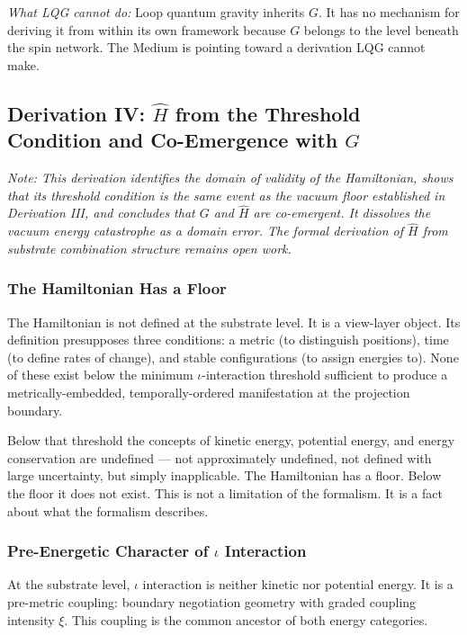 \documentclass[11pt,letterpaper]{article}
\begin{document}
\emph{What LQG cannot do:} Loop quantum gravity inherits \(G\). It has no mechanism for deriving it from within its own framework because \(G\) belongs to the level beneath the spin network. The Medium is pointing toward a derivation LQG cannot make.

\subsection{Derivation IV: \(\hat{H}\) from the Threshold Condition and Co-Emergence with \(G\)}
\label{sec:org7106cd5}

\emph{Note: This derivation identifies the domain of validity of the Hamiltonian, shows that its threshold condition is the same event as the vacuum floor established in Derivation III, and concludes that \(G\) and \(\hat{H}\) are co-emergent. It dissolves the vacuum energy catastrophe as a domain error. The formal derivation of \(\hat{H}\) from substrate combination structure remains open work.}

\subsubsection{The Hamiltonian Has a Floor}
\label{sec:orga63faad}

The Hamiltonian is not defined at the substrate level. It is a view-layer object. Its definition presupposes three conditions: a metric (to distinguish positions), time (to define rates of change), and stable configurations (to assign energies to). None of these exist below the minimum \(\iota\)-interaction threshold sufficient to produce a metrically-embedded, temporally-ordered manifestation at the projection boundary.

Below that threshold the concepts of kinetic energy, potential energy, and energy conservation are undefined --- not approximately undefined, not defined with large uncertainty, but simply inapplicable. The Hamiltonian has a floor. Below the floor it does not exist. This is not a limitation of the formalism. It is a fact about what the formalism describes.

\subsubsection{Pre-Energetic Character of \(\iota\) Interaction}
\label{sec:org918a209}

At the substrate level, \(\iota\) interaction is neither kinetic nor potential energy. It is a pre-metric coupling: boundary negotiation geometry with graded coupling intensity \(\xi\). This coupling is the common ancestor of both energy categories.
\end{document}
